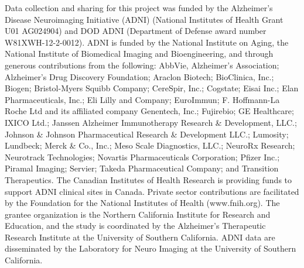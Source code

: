 \documentclass[conference,a4paper]{IEEEtran}
\begin{document}
{\footnotesize Data collection and sharing for this project was funded by the Alzheimer's Disease Neuroimaging Initiative (ADNI) (National Institutes of Health Grant U01 AG024904) and DOD ADNI (Department of Defense award number W81XWH-12-2-0012). ADNI is funded by the National Institute on Aging, the National Institute of Biomedical Imaging and Bioengineering, and through generous contributions from the following: AbbVie, Alzheimer's Association; Alzheimer's Drug Discovery Foundation; Araclon Biotech; BioClinica, Inc.; Biogen; Bristol-Myers Squibb Company; CereSpir, Inc.; Cogstate; Eisai Inc.; Elan Pharmaceuticals, Inc.; Eli Lilly and Company; EuroImmun; F. Hoffmann-La Roche Ltd and its affiliated company Genentech, Inc.; Fujirebio; GE Healthcare; IXICO Ltd.; Janssen Alzheimer Immunotherapy Research \& Development, LLC.; Johnson \& Johnson Pharmaceutical Research \& Development LLC.; Lumosity; Lundbeck; Merck \& Co., Inc.; Meso Scale Diagnostics, LLC.; NeuroRx Research; Neurotrack Technologies; Novartis Pharmaceuticals Corporation; Pfizer Inc.; Piramal Imaging; Servier; Takeda Pharmaceutical Company; and Transition Therapeutics. The Canadian Institutes of Health Research is providing funds to support ADNI clinical sites in Canada. Private sector contributions are facilitated by the Foundation for the National Institutes of Health (www.fnih.org). The grantee organization is the Northern California Institute for Research and Education, and the study is coordinated by the Alzheimer's Therapeutic Research Institute at the University of Southern California. ADNI data are disseminated by the Laboratory for Neuro Imaging at the University of Southern California.}

\vspace{2pt}

\renewcommand{\IEEEbibitemsep}{0pt plus 0.5pt}


\end{document}
